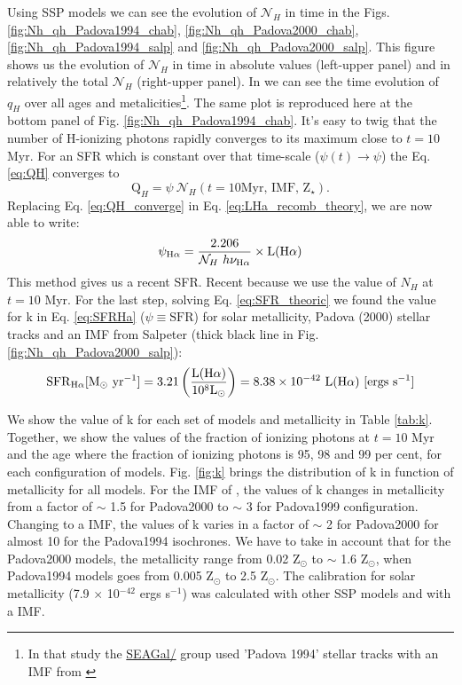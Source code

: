 \documentclass[12pt,letterpaper,usenatbib,useAMS]{article}
\def\Ha{\ifmmode \mathrm{H}\alpha \else H$\alpha$\xspace \fi}
\def\LHalpha{\ifmmode \mathrm{L}(\mathrm{H}\alpha) \else L(H$\alpha$)\xspace \fi}
\begin{document}
Using \citet{BC03a} SSP models we can see the evolution of $\mathcal{N}_H$ in time in the Figs. \ref{fig:Nh_qh_Padova1994_chab}, \ref{fig:Nh_qh_Padova2000_chab}, \ref{fig:Nh_qh_Padova1994_salp} and \ref{fig:Nh_qh_Padova2000_salp}. This figure shows us the evolution of $\mathcal{N}_H$ in time in absolute values (left-upper panel) and in relatively the total $\mathcal{N}_H$ (right-upper panel). In \citet[Fig. 2b]{CF.etal.2011} we can see the time evolution of $q_H$ over all ages and metalicities\footnote{In that study the \href{http://starlight.ufsc.br}{SEAGal/\STARLIGHT} group used 'Padova 1994' \citep{Bertelli.etal.1994} stellar tracks with an IMF from \citet{Chabrier.2003a}}. The same plot is reproduced here at the bottom panel of Fig. \ref{fig:Nh_qh_Padova1994_chab}. It's easy to twig that the number of H-ionizing photons rapidly converges to its maximum close to $t=10$ Myr. For an SFR which is constant over that time-scale ($\psi(t) \rightarrow \psi$) the Eq. \ref{eq:QH} converges to
\begin{equation}
	\mathrm{Q}_H = \psi\ \mathcal{N}_H(t=10\textrm{Myr, IMF, Z}{}_\star).
	\label{eq:QH_converge}
\end{equation}
\noindent Replacing Eq. \ref{eq:QH_converge} in Eq. \ref{eq:LHa_recomb_theory}, we are now able to write:
\begin{equation}
	\psi_{\Ha} = \frac{2.206}{\mathcal{N}_H\ h \nu_{\Ha}} \times \LHalpha
	\label{eq:SFR_theoric}
\end{equation}
\noindent This method gives us a recent SFR. Recent because we use the value of $N_H$ at $t=10$ Myr. For the last step, solving Eq. \ref{eq:SFR_theoric} we found the value for k in Eq. \ref{eq:SFRHa} ($\psi \equiv \mathrm{SFR}$) for solar metallicity, Padova (2000) stellar tracks and an IMF from Salpeter (thick black line in Fig. \ref{fig:Nh_qh_Padova2000_salp}):
\begin{equation}
	\mathrm{SFR}_{\Ha} [\mathrm{M}_\odot\ \mathrm{yr}^{-1}] = 3.21\left(\frac{\LHalpha}{10^8\mathrm{L}_\odot}\right) = 8.38 \times 10^{-42}\ \LHalpha\  [\mathrm{ergs}\ \mathrm{s}^{-1}]
	\label{eq:SFRNeb}
\end{equation}

We show the value of k for each set of models and metallicity in Table \ref{tab:k}. Together, we show the values of the fraction of ionizing photons at $t=10$ Myr and the age where the fraction of ionizing photons is 95, 98 and 99 per cent, for each configuration of models. Fig. \ref{fig:k} brings the distribution of k in function of metallicity for all models. For the IMF of \citet{Salpeter.1955a}, the values of k changes in metallicity from a factor of $\sim$ 1.5 for Padova2000 to $\sim$ 3 for Padova1999 configuration. Changing to a \citet{Chabrier.2003a} IMF, the values of k varies in a factor of $\sim$ 2 for Padova2000 for almost 10 for the Padova1994 isochrones. We have to take in account that for the Padova2000 models, the metallicity range from 0.02 Z$_\odot$ to $\sim$ 1.6 Z$_\odot$, when Padova1994 models goes from 0.005 Z$_\odot$ to 2.5 Z$_\odot$. The \citet{Kennicutt.1998a} calibration for solar metallicity (7.9 $\times$ 10$^{-42}$ ergs s$^{-1}$) was calculated with other SSP models and with a \citet{Salpeter.1955a} IMF. 
\end{document}
